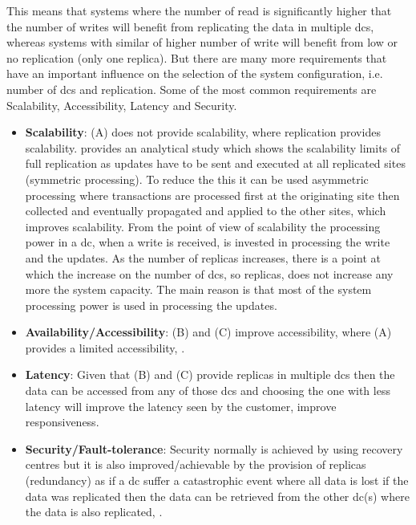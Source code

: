 \documentclass[english]{article}
\begin{document}
This means that systems where the number of read is significantly higher that the number of writes will benefit from replicating the data in multiple \glspl{dc}, whereas systems with similar of higher number of write will benefit from low or no replication (only one replica). But there are many more requirements that have an important influence on the selection of the system configuration, i.e. number of \glspl{dc} and replication. Some of the most common requirements are Scalability, Accessibility, Latency and Security.
\begin{itemize}
	\item {\bf Scalability}: (A) does not provide scalability, where replication provides scalability. \cite{Jimenez-Peris2003a} provides an analytical study which shows the scalability limits of full replication as updates have to be sent and executed at all replicated sites (symmetric processing). To reduce the this it can be used asymmetric processing where transactions are processed first at the originating site then collected and eventually propagated and applied to the other sites, which improves scalability. From the point of view of scalability the processing power in a \gls{dc}, when a write is received, is invested in processing the write and the updates. As the number of replicas increases, there is a point at which the increase on the number of \glspl{dc}, so replicas, does not increase any more the system capacity. The main reason is that most of the system processing power is used in processing the updates. 
	\item {\bf Availability/Accessibility}: (B) and (C) improve accessibility, where (A) provides a limited accessibility, \cite{Ladin1992a}.
	\item {\bf Latency}: Given that (B) and (C) provide replicas in multiple \glspl{dc} then the data can be accessed from any of those \glspl{dc} and choosing the one with less latency will improve the latency seen by the customer, improve responsiveness.
	\item {\bf Security/Fault-tolerance}: Security normally is achieved by using recovery centres but it is also improved/achievable by the provision of replicas (redundancy) as if a \gls{dc} suffer a catastrophic event where all data is lost if the data was replicated then the data can be retrieved from the other \gls{dc}(s) where the data is also replicated, \cite{Guerraoui1996a, Neumann1956a}.
\end{itemize}
\end{document}
